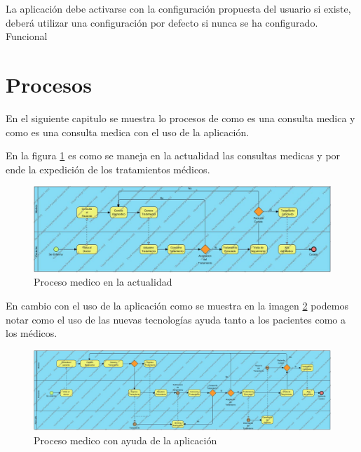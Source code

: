 	
	\begin{ReqSist}
		{La aplicación debe activarse con la configuración propuesta del usuario si existe, deberá utilizar una configuración por defecto si nunca se ha configurado.}
		{\alta}
		{}
		{Funcional}
		
	\end{ReqSist}
	
	
	
	


\section{Procesos}

En el siguiente capitulo se muestra lo procesos de como es una consulta medica y como es una consulta medica con el uso de la aplicación.


En la figura \ref{fig:proceso1} es como se maneja en la actualidad las consultas medicas y por ende la expedición de los tratamientos médicos.
\begin{figure}[htb]
	\centering
	\includegraphics[width=1.1\textwidth]{images/cap2/ProcesoMedico}
	\caption{Proceso medico en la actualidad} \label{fig:proceso1}
\end{figure}

En cambio con el uso de la aplicación como se muestra en la imagen \ref{fig:proceso2} podemos notar como el uso de las nuevas tecnologías ayuda tanto a los pacientes como a los médicos.

\begin{figure}[htb]
	\centering
	\includegraphics[width=1.1\textwidth]{images/cap2/RemPillstratamiento}
	\caption{Proceso medico con ayuda de la aplicación} \label{fig:proceso2}
\end{figure}


